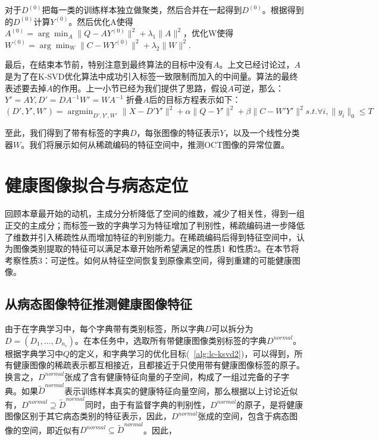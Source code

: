     对于$D^{(0)}$把每一类的训练样本独立做聚类，然后合并在一起得到$D^{(0)}$。根据得到的$D^{(0)}$计算$Y^{(0)}$。然后优化A使得 $A^{(0)} = \arg\min _{A} \|Q - AY^{(0)}\|^2 + \lambda_1 \|A\|^2$，优化W使得$W^{(0)} = \arg\min_{W} \|C - WY^{(0)}\|^2+ \lambda_2\|W\|^2$.

    最后，在结束本节前，特别注意到最终算法的目标中没有$A$。上文已经讨论过，$A$是为了在K-SVD优化算法中成功引入标签一致限制而加入的中间量。算法的最终表述要去掉$A$的作用。上一小节已经为我们提供了思路，假设$A$可逆，那么：$Y' = AY, D' = D A^{-1} W' = W A^{-1}$ 折叠$A$后的目标方程表示如下：
    \begin{equation}
    \label{alg:lc-ksvd3}
    (D', Y', W') = \mathop{\arg\min}_{D', Y', W'} \| X - D'Y'\|^2 + \alpha \|Q - Y'\| ^2 + \beta\|C - W' Y' \| ^2 s.t. \forall i, \|y_i\|_0 \le T 
    \end{equation}

    至此，我们得到了带有标签的字典$D$，每张图像的特征表示$Y$，以及一个线性分类器$W$。我们将展示如何从稀疏编码的特征空间中，推测OCT图像的异常位置。

\section{健康图像拟合与病态定位}
\label{sec:norm-recon}
    回顾本章最开始的动机，主成分分析降低了空间的维数，减少了相关性，得到一组正交的主成分；而标签一致的字典学习为特征增加了判别性，稀疏编码进一步降低了维数并引入稀疏性从而增加特征的判别能力。在稀疏编码后得到特征空间中，认为图像类别提取的特征可以满足本章开始所希望满足的性质1 和性质2。在本节将考察性质3：可逆性。如何从特征空间恢复到原像素空间，得到重建的可能健康图像。

    \subsection{从病态图像特征推测健康图像特征}
    由于在字典学习中，每个字典带有类别标签，所以字典$D$可以拆分为$D = (D_1, \dots, D_{n_c})$。在本任务中，选取所有带健康图像类别标签的字典$D^{normal}$。根据字典学习中$Q$的定义，和字典学习的优化目标(~\ref{alg:lc-ksvd2})，可以得到，所有健康图像的稀疏表示都互相接近，且都接近于只使用带有健康图像标签的原子。换言之，$D^{normal}$张成了含有健康特征向量的子空间，构成了一组过完备的子字典。如果$\tilde{D}^{normal}$表示训练样本真实的健康特征向量空间，那么根据以上讨论近似有，$D^{normal} \supseteq \tilde{D}^{normal}$同时，由于有监督字典的判别性，$D^{normal}$的原子，是将健康图像区别于其它病态类别的特征表示，因此，$D^{normal}$张成的空间，包含于病态图像的空间，即近似有$D^{normal} \subseteq \tilde{D}^{normal}$。因此，

